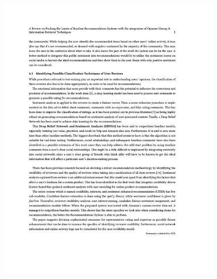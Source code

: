 \begin{figure}[h!]
\centering
\includegraphics[width=\textwidth]{images/appendix/papers/review/A Review on Pushing the Limits of Baseline Recommendation Systems with the integration of Opinion Mining & Information Retrieval Techniques 5.jpeg}
\end{figure}

